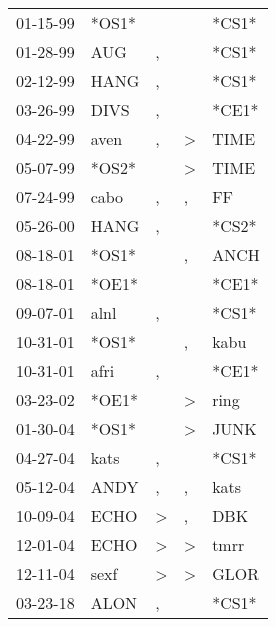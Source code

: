 \begin{supertabular}{lllll}
 01-15-99 &  *OS1* &               &               &  *CS1* \\
 01-28-99 &    AUG &             , &               &  *CS1* \\
 02-12-99 &   HANG &             , &               &  *CS1* \\
 03-26-99 &   DIVS &             , &               &  *CE1* \\
 04-22-99 &   aven &             , &  \textgreater &   TIME \\
 05-07-99 &  *OS2* &               &  \textgreater &   TIME \\
 07-24-99 &   cabo &             , &             , &     FF \\
 05-26-00 &   HANG &             , &               &  *CS2* \\
 08-18-01 &  *OS1* &               &             , &   ANCH \\
 08-18-01 &  *OE1* &               &               &  *CE1* \\
 09-07-01 &   alnl &             , &               &  *CS1* \\
 10-31-01 &  *OS1* &               &             , &   kabu \\
 10-31-01 &   afri &             , &               &  *CE1* \\
 03-23-02 &  *OE1* &               &  \textgreater &   ring \\
 01-30-04 &  *OS1* &               &  \textgreater &   JUNK \\
 04-27-04 &   kats &             , &               &  *CS1* \\
 05-12-04 &   ANDY &             , &             , &   kats \\
 10-09-04 &   ECHO &  \textgreater &             , &    DBK \\
 12-01-04 &   ECHO &  \textgreater &  \textgreater &   tmrr \\
 12-11-04 &   sexf &  \textgreater &  \textgreater &   GLOR \\
 03-23-18 &   ALON &             , &               &  *CS1* \\
\end{supertabular}
